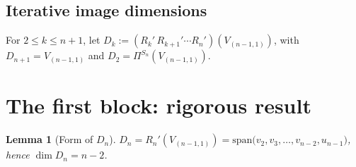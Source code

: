\documentclass[11pt]{article}
\newtheorem{lemma}[theorem]{Lemma}
\theoremstyle{definition}
\begin{document}
\subsection{Iterative image dimensions}
For $2\le k\le n+1$, let
$D_k:=(R_k'\,R_{k+1}'\cdots R_n')(V_{(n-1,1)})$, with
$D_{n+1}=V_{(n-1,1)}$ and $D_2=\Pi^{S_n}(V_{(n-1,1)})$.

\section{The first block: rigorous result}\label{sec:Dn}

\begin{lemma}[Form of $D_n$]\label{lem:Dn}
$D_n=R_n'(V_{(n-1,1)})=\mathrm{span}\bigl(v_2,v_3,\ldots,v_{n-2},u_{n-1}\bigr)$,
hence $\dim D_n=n-2$.
\end{lemma}
\end{document}
